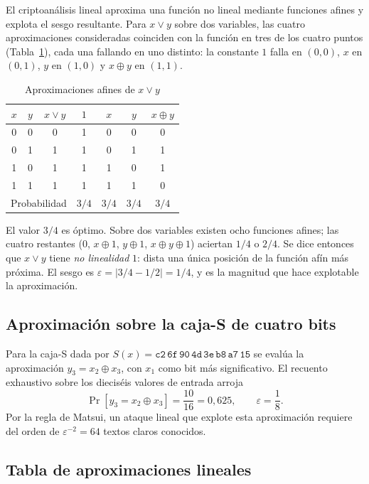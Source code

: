 \documentclass[conference]{IEEEtran}
\newcommand{\xor}{\oplus}
\begin{document}
El criptoanálisis lineal aproxima una función no lineal mediante funciones afines
y explota el sesgo resultante. Para $x \lor y$ sobre dos variables, las cuatro
aproximaciones consideradas coinciden con la función en tres de los cuatro puntos
(Tabla~\ref{tab:or}), cada una fallando en uno distinto: la constante $1$ falla en
$(0,0)$, $x$ en $(0,1)$, $y$ en $(1,0)$ y $x \xor y$ en $(1,1)$.

\begin{table}[!ht]
\caption{Aproximaciones afines de $x \lor y$}
\label{tab:or}
\centering
\begin{tabular}{@{}ccccccc@{}}
\toprule
$x$ & $y$ & $x \lor y$ & $1$ & $x$ & $y$ & $x \xor y$ \\
\midrule
0 & 0 & 0 & 1 & 0 & 0 & 0 \\
0 & 1 & 1 & 1 & 0 & 1 & 1 \\
1 & 0 & 1 & 1 & 1 & 0 & 1 \\
1 & 1 & 1 & 1 & 1 & 1 & 0 \\
\midrule
\multicolumn{3}{c}{Probabilidad} & $3/4$ & $3/4$ & $3/4$ & $3/4$ \\
\bottomrule
\end{tabular}
\end{table}

El valor $3/4$ es óptimo. Sobre dos variables existen ocho funciones afines; las
cuatro restantes ($0$, $x\xor1$, $y\xor1$, $x\xor y\xor1$) aciertan $1/4$ o $2/4$.
Se dice entonces que $x \lor y$ tiene \emph{no linealidad} $1$: dista una única
posición de la función afín más próxima. El sesgo es
$\varepsilon = |3/4 - 1/2| = 1/4$, y es la magnitud que hace explotable la
aproximación.

\subsection{Aproximación sobre la caja-S de cuatro bits}

Para la caja-S dada por $S(x) = \mathtt{c2\,6f\,90\,4d\,3e\,b8\,a7\,15}$ se evalúa
la aproximación $y_3 = x_2 \xor x_3$, con $x_1$ como bit más significativo. El
recuento exhaustivo sobre los dieciséis valores de entrada arroja
\begin{equation}
\Pr[y_3 = x_2 \xor x_3] = \frac{10}{16} = 0{,}625,
\qquad \varepsilon = \frac{1}{8}.
\end{equation}
Por la regla de Matsui, un ataque lineal que explote esta aproximación requiere del
orden de $\varepsilon^{-2} = 64$ textos claros conocidos.

\subsection{Tabla de aproximaciones lineales}
\end{document}
